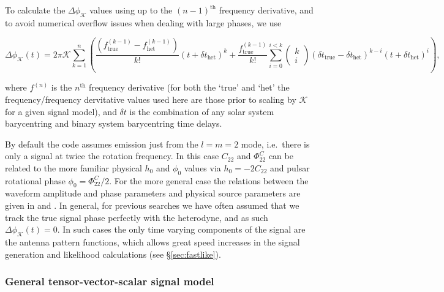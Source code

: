 To calculate the $\Delta\phi_{\mathcal{K}}$ values using up to the $(n-1)^{\text{th}}$ frequency derivative, and to avoid numerical overflow issues when dealing
with large phases, we use
\begin{widetext}
\begin{equation}\label{eq:deltaphi}
\Delta\phi_{\mathcal{K}}(t) = 2\pi \mathcal{K} \sum_{k=1}^n \left( \frac{\left(f^{(k-1)}_{{\text{true}}} - f^{(k-1)}_{{\text{het}}}\right)}{k!}(t+\delta t_{\text{het}})^k + \frac{f^{(k-1)}_{{\text{true}}}}{k!} 
\sum_{i=0}^{i<k} \left(\begin{array}{c}k \\ i\end{array} \right) (\delta t_{\text{true}}-\delta t_{\text{het}})^{k-i} (t+\delta t_{\text{het}})^i \right),
\end{equation}
\end{widetext}
where $f^{(n)}$ is the $n^{\text{th}}$ frequency derivative (for both the `true' and `het' the frequency/frequency dervitative values used here
are those prior to scaling by $\mathcal{K}$ for a given signal model), and $\delta t$ is the combination of any solar system barycentring and binary system barycentring
time delays.

By default the code assumes emission just from the $l=m=2$ mode, i.e.\ there is only a signal at twice the
rotation frequency. In this case $C_{22}$ and $\Phi_{22}^C$ can be related to the more familiar physical
$h_0$ and $\phi_0$ values via $h_0 = -2C_{22}$ \citep[where the minus sign maintains consistency of equation~\ref{eq:h2f} with the form given in][]{1998PhRvD..58f3001J} and pulsar rotational 
phase $\phi_0 = \Phi_{22}^C/2$. For the more general case the
relations between the waveform amplitude and phase parameters and physical source parameters are given in
\citet{2015arXiv150105832J} and \citet{2015MNRAS.453.4399P}. In general, for previous searches we have often assumed that we track the true
signal phase perfectly with the heterodyne, and as such $\Delta\phi_{\mathcal{K}}(t) = 0$. In such cases the only time
varying components of the signal are the antenna pattern functions, which allows great speed increases in the
signal generation and likelihood calculations (see \S\ref{sec:fastlike}).

\subsubsection{General tensor-vector-scalar signal model}


